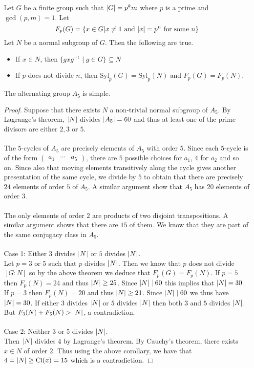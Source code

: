 \documentclass[a4paper]{article}
\begin{document}
\begin{lmm}{}{} Let $G$ be a finite group such that $\abs{G}=p^km$ where $p$ is a prime and $\gcd(p,m)=1$. Let $$F_p(G)=\{x\in G|x\neq 1\text{ and }\abs{x}=p^n\text{ for some }n\}$$ Let $N$ be a normal subgroup of $G$. Then the following are true. 
\begin{itemize}
\item If $x\in N$, then $\{gxg^{-1}\;|\;g\in G\}\subseteq N$
\item If $p$ does not divide $n$, then $\text{Syl}_p(G)=\text{Syl}_p(N)$ and $F_p(G)=F_p(N)$. 
\end{itemize}
\end{lmm}

\begin{prp}{}{} The alternating group $A_5$ is simple. \tcbline
\begin{proof}
Suppose that there exists $N$ a non-trivial normal subgroup of $A_5$. By Lagrange's theorem, $\abs{N}$ divides $\abs{A_5}=60$ and thus at least one of the prime divisors are either $2,3$ or $5$. \\~\\
The $5$-cycles of $A_5$ are precisely elements of $A_5$ with order $5$. Since each $5$-cycle is of the form $\begin{pmatrix} a_1 & \cdots & a_5\end{pmatrix}$, there are $5$ possible choices for $a_1$, $4$ for $a_2$ and so on. Since also that moving elements transitively along the cycle gives another presentation of the same cycle, we divide by $5$ to obtain that there are precisely $24$ elements of order $5$ of $A_5$. A similar argument show that $A_5$ has $20$ elements of order $3$. \\~\\

The only elements of order $2$ are products of two disjoint transpositions. A similar argument shows that there are $15$ of them. We know that they are part of the same conjugacy class in $A_5$. \\~\\

Case 1: Either $3$ divides $\abs{N}$ or $5$ divides $\abs{N}$. \\
Let $p=3$ or $5$ such that $p$ divides $\abs{N}$. Then we know that $p$ does not divide $[G:N]$ so by the above theorem we deduce that $F_p(G)=F_p(N)$. If $p=5$ then $F_p(N)=24$ and thus $\abs{N}\geq 25$. Since $\abs{N}\;|\;60$ this implies that $\abs{N}=30$. If $p=3$ then $F_p(N)=20$ and thus $\abs{N}\geq 21$. Since $\abs{N}\;|\;60$ we thus have $\abs{N}=30$. If either $3$ divides $\abs{N}$ or $5$ divides $\abs{N}$ then both $3$ and $5$ divides $\abs{N}$. But $F_3(N)+F_5(N)>\abs{N}$, a contradiction. \\~\\

Case 2: Neither $3$ or $5$ divides $\abs{N}$. \\
Then $\abs{N}$ divides $4$ by Lagrange's theorem. By Cauchy's theorem, there exists $x\in N$ of order $2$. Thus using the above corollary, we have that $4=\abs{N}\geq\text{Cl}(x)=15$ which is a contradiction. 
\end{proof}
\end{prp}
\end{document}
